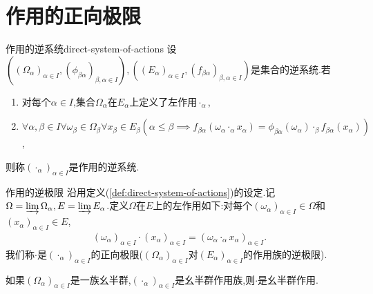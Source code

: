 \section{作用的正向极限}

\begin{definition}{作用的逆系统}{direct-system-of-actions}
	设$\left(\left(\Omega_{\alpha}\right)_{\alpha\in I},\left(\phi_{\beta\alpha}\right)_{\beta,\alpha\in I}\right),\left(\left(E_{\alpha}\right)_{\alpha\in I},\left(f_{\beta\alpha}\right)_{\beta,\alpha\in I}\right)$是集合的逆系统.若
	\begin{enumerate}
		\item 对每个$\alpha\in I$,集合$\Omega_{\alpha}$在$E_{\alpha}$上定义了左作用$\cdot_{\alpha}$,
		\item $\forall\alpha,\beta\in I\forall \omega_{\beta}\in\Omega_{\beta}\forall x_{\beta}\in E_{\beta}\left(\alpha\leq\beta\implies f_{\beta\alpha}\left(\omega_{\alpha}\cdot_{\alpha}x_{\alpha}\right)=\phi_{\beta\alpha}\left(\omega_{\alpha}\right)\cdot_{\beta}f_{\beta\alpha}\left(x_{\alpha}\right)\right)$,
	\end{enumerate}
	则称$\left(\cdot_{\alpha}\right)_{\alpha\in I}$是作用的逆系统.
\end{definition}

\begin{definition}{作用的逆极限}{}
	沿用定义(\ref{def:direct-system-of-actions})的设定.记$\Omega=\varinjlim\Omega_{\alpha},E=\varinjlim E_{\alpha}$.定义$\Omega$在$E$上的左作用如下:对每个$\left(\omega_{\alpha}\right)_{\alpha\in I}\in\Omega$和$\left(x_{\alpha}\right)_{\alpha\in I}\in E$,
	\begin{align*}
		\left(\omega_{\alpha}\right)_{\alpha\in I}\cdot\left(x_{\alpha}\right)_{\alpha\in I}=\left(\omega_{\alpha}\cdot_{\alpha}x_{\alpha}\right)_{\alpha\in I}.
	\end{align*}
	我们称$\cdot$是$\left(\cdot_{\alpha}\right)_{\alpha\in I}$的正向极限($\left(\Omega_{\alpha}\right)_{\alpha\in I}$对$\left(E_{\alpha}\right)_{\alpha\in I}$的作用族的逆极限).
\end{definition}

\begin{remark}{}{}
	如果$\left(\Omega_{\alpha}\right)_{\alpha\in I}$是一族幺半群,$\left(\cdot_{\alpha}\right)_{\alpha\in I}$是幺半群作用族,则$\cdot$是幺半群作用.
\end{remark}

